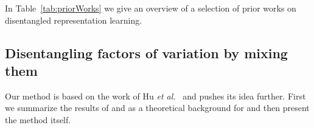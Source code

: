 \documentclass[a4paper,12pt]{report}
\begin{document}
\vspace{5mm}
In Table~\ref{tab:priorWorks} we give an overview of a selection of prior works on disentangled representation learning.
\begin{table} [H]
\centering
{}
\caption{Overview and characteristics of prior works on disentangled representation learning. (LT) learning type, (us) unsupervised, (ss) semi-supervised, (sv) supervised.} \label{tab:priorWorks}
\end{table}


\subsection{Disentangling factors of variation by mixing them}
Our method is based on the work of Hu \textit{et al.}~\cite{DisentFacOfVarByMixTh} and pushes its idea further. First we summarize the results of \cite{ChallengInDisentIFoF} and \cite{UnderstDegenAndAmbInAT} as a theoretical background for \cite{DisentFacOfVarByMixTh} and then present the method itself. 
\end{document}
